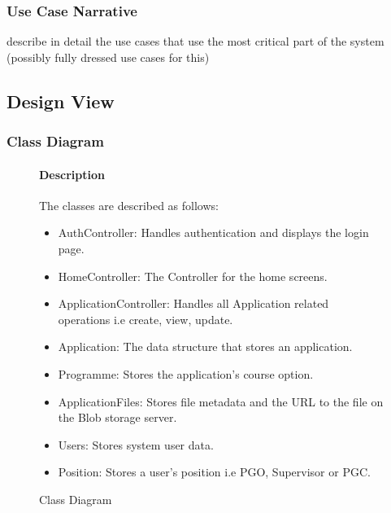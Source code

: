 \documentclass[11pt]{article}
\begin{document}
\subsubsection{Use Case Narrative}
describe in detail the use cases that use the most critical part of the system (possibly fully dressed use cases for this)
\subsection{Design View}
\subsubsection{Class Diagram}
\begin{figure}[H]
	\caption{Class Diagram}
	
\paragraph{Description}
The classes are described as follows:
\begin{itemize}
	\item AuthController: Handles authentication and displays the login page.
	\item HomeController: The Controller for the home screens.
	\item ApplicationController: Handles all Application related operations i.e create, view, update.
	\item Application: The data structure that stores an application.
	\item Programme: Stores the application's course option.
	\item ApplicationFiles: Stores file metadata and the URL to the file on the Blob storage server.
	\item Users: Stores system user data.
	\item Position: Stores a user's position i.e PGO, Supervisor or PGC.
\end{itemize}
\end{figure}
\end{document}
